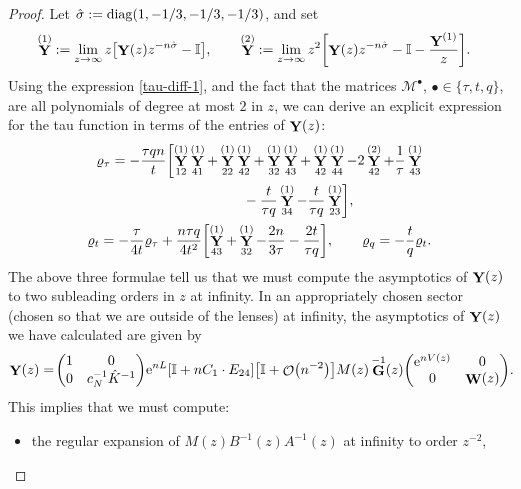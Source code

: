 \documentclass[10pt,a4paper]{amsart}
\DeclareMathOperator{\OO}{\mathcal{O}}
\DeclareMathOperator{\YY}{{\bf Y}}
\DeclareMathOperator{\WW}{{\bf W}}
\DeclareMathOperator{\GG}{{\bf G}}
\numberwithin{equation}{section}
\begin{document}
\begin{proof}
 Let $\hat{\sigma} := {\rm diag}(1,-1/3,-1/3,-1/3)$, and set
 \begin{align*}
 &\YY^{(1)} := \lim_{z\to \infty} z\bigl[\YY(z)z^{-n\hat{\sigma}} - \mathbb{I}\bigr],\qquad
 \YY^{(2)} := \lim_{z\to \infty} z^2\biggl[\YY(z)z^{-n\hat{\sigma}} - \mathbb{I} - \frac{\YY^{(1)}}{z}\biggr].
 \end{align*}
 Using the expression \eqref{tau-diff-1}, and the fact that the matrices $\mathcal{M}^{\bullet}$, $\bullet \in \{\tau,t,q\}$, are all polynomials of degree at most $2$ in $z$, we can derive an explicit expression for the tau function in terms of the entries of $\YY(z)$:
 \begin{gather*}
 \varrho_{\tau} = -\frac{\tau q n}{t}\biggl[\YY^{(1)}_{12}\YY^{(1)}_{4 1} + \YY^{(1)}_{2 2}\YY^{(1)}_{4 2} + \YY^{(1)}_{3 2}\YY^{(1)}_{4 3} + \YY^{(1)}_{42}\YY^{(1)}_{4 4} - 2\YY^{(2)}_{4 2}+ \frac{1}{\tau}\YY^{(1)}_{4 3}\\
 \hphantom{\varrho_{\tau} = -\frac{\tau q n}{t}\biggl[}{}
 - \frac{t}{\tau q}\YY^{(1)}_{34} - \frac{t}{\tau q}\YY^{(1)}_{2 3} \biggr],\\
 \varrho_t = -\frac{\tau}{4t}\varrho_{\tau} + \frac{n\tau q}{4t^2}\biggl[\YY^{(1)}_{43} + \YY^{(1)}_{32} - \frac{2n}{3\tau} - \frac{2t}{\tau q}\biggr], \qquad
 \varrho_q = -\frac{t}{q}\varrho_t.
 \end{gather*}
 The above three formulae tell us that we must compute the asymptotics of $\YY(z)$ to two subleading orders in $z$ at infinity. In an appropriately chosen sector (chosen so that we are outside of the lenses) at infinity, the asymptotics of $\YY(z)$ we have calculated are given by
 \begin{gather} \label{Y-asymptotics-final}
 \YY(z) =
 \!\begin{pmatrix}
 1 & 0\\
 0 & c_N^{-1} \hat{K}^{-1}
 \end{pmatrix}\!
 {\rm e}^{nL} [\mathbb{I} + n C_1 \cdot E_{24}] \bigl[\mathbb{I} + \OO\bigl(n^{-2}\bigr) \bigr] M(z) \GG^{-1}(z)
 \!\begin{pmatrix}
 {\rm e}^{n V(z)} & 0\\
 0 & \WW(z)
 \end{pmatrix}\!.\!\!
 \end{gather}
 This implies that we must compute:
 \begin{itemize}\itemsep=0pt\samepage
 \item the regular expansion of $M(z) B^{-1}(z)A^{-1}(z)$ at infinity to order $z^{-2}$,

\end{itemize}
\end{proof}
\end{document}
